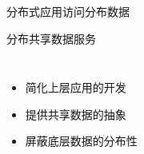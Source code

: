 % 
\begin{frame}{分布式应用访问分布数据}
  
\end{frame}
\begin{frame}{分布共享数据服务}
  \begin{columns}
	  \begin{itemize}[<+->]
		\setlength\itemsep{8pt}
		\item 简化上层应用的开发
		\item 提供共享数据的抽象
		\item 屏蔽底层数据的分布性
	  \end{itemize}
  \end{columns}
\end{frame}
